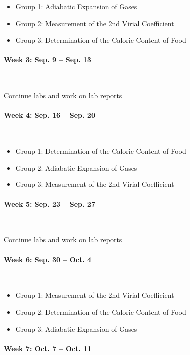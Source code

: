 \documentclass[12pt, letterpaper]{article}
\begin{document}
\begin{itemize}
  \item Group 1: Adiabatic Expansion of Gases
  \item Group 2: Measurement of the 2nd Virial Coefficient
  \item Group 3: Determination of the Caloric Content of Food
\end{itemize}

\paragraph{Week 3: Sep. 9 -- Sep. 13}~

Continue labs and work on lab reports

\paragraph{Week 4: Sep. 16 -- Sep. 20}~

\begin{itemize}
  \item Group 1: Determination of the Caloric Content of Food
  \item Group 2: Adiabatic Expansion of Gases
  \item Group 3: Measurement of the 2nd Virial Coefficient
\end{itemize}

\paragraph{Week 5: Sep. 23 -- Sep. 27}~

Continue labs and work on lab reports

\paragraph{Week 6: Sep. 30 -- Oct. 4}~

\begin{itemize}
  \item Group 1: Measurement of the 2nd Virial Coefficient
  \item Group 2: Determination of the Caloric Content of Food
  \item Group 3: Adiabatic Expansion of Gases
\end{itemize}

\paragraph{Week 7: Oct. 7 -- Oct. 11}~
\end{document}
